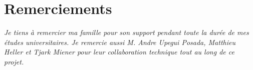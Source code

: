 \chapter*{Remerciements} %

\textit{Je tiens à remercier ma famille pour son support pendant toute la durée de mes études universitaires.
Je remercie aussi M. Andre Upegui Posada, Matthieu Heller et Tjark Miener pour leur collaboration technique tout au long de ce projet.}